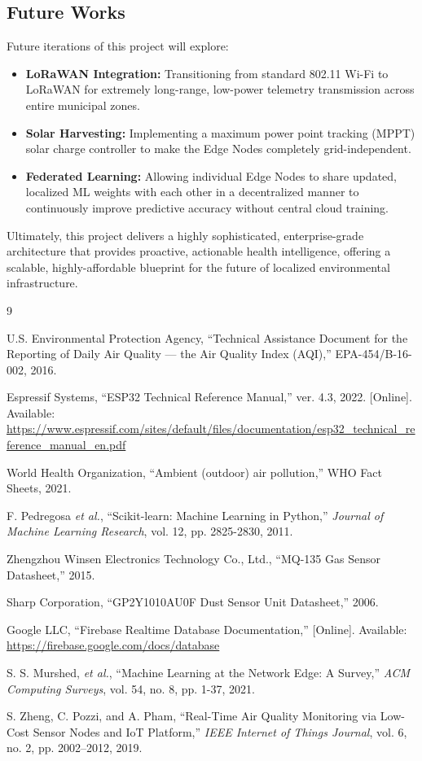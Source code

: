 \documentclass[12pt,journal,onecolumn,a4paper]{IEEEtran}
\begin{document}
\subsection{Future Works}
Future iterations of this project will explore:
\begin{itemize}
    \item \textbf{LoRaWAN Integration:} Transitioning from standard 802.11 Wi-Fi to LoRaWAN for extremely long-range, low-power telemetry transmission across entire municipal zones.
    \item \textbf{Solar Harvesting:} Implementing a maximum power point tracking (MPPT) solar charge controller to make the Edge Nodes completely grid-independent.
    \item \textbf{Federated Learning:} Allowing individual Edge Nodes to share updated, localized ML weights with each other in a decentralized manner to continuously improve predictive accuracy without central cloud training.
\end{itemize}

Ultimately, this project delivers a highly sophisticated, enterprise-grade architecture that provides proactive, actionable health intelligence, offering a scalable, highly-affordable blueprint for the future of localized environmental infrastructure.

\begin{thebibliography}{9}

U.S. Environmental Protection Agency, ``Technical Assistance Document for the Reporting of Daily Air Quality — the Air Quality Index (AQI),'' EPA-454/B-16-002, 2016.

Espressif Systems, ``ESP32 Technical Reference Manual,'' ver. 4.3, 2022. [Online]. Available: \url{https://www.espressif.com/sites/default/files/documentation/esp32_technical_reference_manual_en.pdf}

World Health Organization, ``Ambient (outdoor) air pollution,'' WHO Fact Sheets, 2021.

F. Pedregosa \textit{et al.}, ``Scikit-learn: Machine Learning in Python,'' \textit{Journal of Machine Learning Research}, vol. 12, pp. 2825-2830, 2011.

Zhengzhou Winsen Electronics Technology Co., Ltd., ``MQ-135 Gas Sensor Datasheet,'' 2015.

Sharp Corporation, ``GP2Y1010AU0F Dust Sensor Unit Datasheet,'' 2006.

Google LLC, ``Firebase Realtime Database Documentation,'' [Online]. Available: \url{https://firebase.google.com/docs/database}

S. S. Murshed, \textit{et al.}, ``Machine Learning at the Network Edge: A Survey,'' \textit{ACM Computing Surveys}, vol. 54, no. 8, pp. 1-37, 2021.

S. Zheng, C. Pozzi, and A. Pham, ``Real-Time Air Quality Monitoring via Low-Cost Sensor Nodes and IoT Platform,'' \textit{IEEE Internet of Things Journal}, vol. 6, no. 2, pp. 2002–2012, 2019.

\end{thebibliography}
\end{document}
